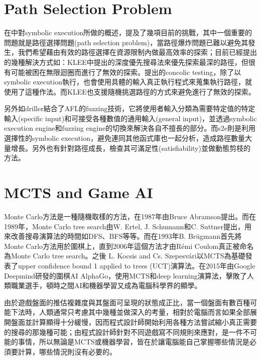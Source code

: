 \documentclass[12pt,a4paper,oneside]{book}
\begin{document}
\section{Path Selection Problem}

在\cite{sharma2012critical}\cite{schwartz2010all}中對symbolic execution所做的概述，提及了幾項目前的挑戰，其中一個重要的問題就是路徑選擇問題(path selection problem)，當路徑爆炸問題已難以避免其發生，我們希望藉由有效的路徑選擇在資源限制內做最高效率的探索；目前已經提出的幾種解決方式如：KLEE\cite{cadar2008klee}中提出的深度優先搜尋法來優先探索最深的路徑，但很有可能被困在無限迴圈而進行了無效的探索。\cite{sen2007concolic}提出的concolic testing，除了以symbolic execution執行，也會使用具體的輸入真正執行程式來蒐集執行路徑，\cite{sen2005cute}就使用了這種作法。而KLEE\cite{cadar2008klee}也支援隨機挑選路徑的方式來避免進行了無效的探索。

另外如driller\cite{stephens2016driller}結合了AFL\cite{AFL}的fuzzing技術，它將使用者輸入分類為需要特定值的特定輸入(specific input)和可接受各種數值的通用輸入(general input)，並透過symbolic execution engine和fuzzing engine的切換來解決各自不擅長的部分。而s2e\cite{chipounov2012s2e}則是利用選擇性的symbolic execution，避免連同其他函式庫也一起分析，造成路徑數量大量增長。另外也有針對路徑成長，檢查其可滿足性(satisfiability)並做動態剪枝的方法\cite{PathPruning}。

\section{MCTS and Game AI}

Monte Carlo方法是一種隨機取樣的方法，在1987年由Bruce Abramson提出\cite{mcmethod}。而在1989年，Monte Carlo tree search由W. Ertel, J. Schumann和C. Suttner提出，用來改善搜尋演算法的時間如DFS、BFS等等。而在1993年B. Brügmann首先將Monte Carlo方法用於圍棋上\cite{mc_go}，直到2006年這個方法才由Rémi Coulom真正被命名為Monte Carlo tree search\cite{MCTS_naming}。之後 L. Kocsis and Cs. Szepesvári以MCTS為基礎發表了upper confidence bound 1 applied to trees (UCT)演算法\cite {UCT}。在2015年由Google Deepmind研發的圍棋AI AlphaGo\cite{alphago}，使用MCTS和deep learning演算法，擊敗了人類職業選手，頓時之間AI和機器學習又成為電腦科學界的顯學。

由於遊戲盤面的推估複雜度與其盤面可呈現的狀態成正比，當一個盤面有數百種可能下法時，人類通常只考慮其中幾種並做深入的考量，相對於電腦而言如果全部展開盤面並計算顯得十分緩慢，因而程式設計師開始利用各種方法嘗試縮小真正需要的搜尋的那幾種可能；由程式設計師針對不同遊戲寫不同規則來應對，是一件不可能的事情，所以無論是MCTS或機器學習，皆在於讓電腦能自己掌握哪些情況是必須要計算，哪些情況則沒有必要的。
\end{document}

